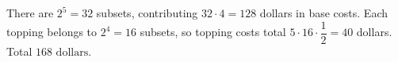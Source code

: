 There are $2^5=32$ subsets, contributing $32\cdot4=128$ dollars in base costs. Each topping belongs to $2^4=16$ subsets, so topping costs total $5\cdot16\cdot\dfrac{1}{2}=40$ dollars. Total $\boxed{168\text{ dollars}}$.
